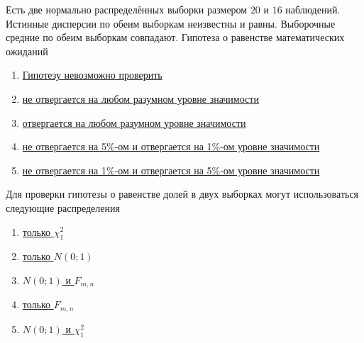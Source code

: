 \documentclass[t]{beamer}
\begin{document}
 \begin{frame} \label{7} 
\begin{block}{7} 

   Есть две нормально распределённых выборки размером $20$ и $16$ наблюдений. Истинные дисперсии по обеим выборкам неизвестны и равны. Выборочные средние по обеим выборкам совпадают. Гипотеза о равенстве математических ожиданий
  


 \end{block} 
\begin{enumerate} 
\item[] \hyperlink{7-No}{\beamergotobutton{} Гипотезу невозможно проверить}
\item[] \hyperlink{7-Yes}{\beamergotobutton{} не отвергается на любом разумном уровне значимости}
\item[] \hyperlink{7-No}{\beamergotobutton{} отвергается на любом разумном уровне значимости}
\item[] \hyperlink{7-No}{\beamergotobutton{} не отвергается на 5\%-ом и отвергается на 1\%-ом уровне значимости}
\item[] \hyperlink{7-No}{\beamergotobutton{} не отвергается на 1\%-ом и отвергается на 5\%-ом уровне значимости}
\end{enumerate} 
\end{frame} 


 \begin{frame} \label{8} 
\begin{block}{8} 

  Для проверки гипотезы о равенстве долей в двух выборках  могут использоваться следующие распределения
  


 \end{block} 
\begin{enumerate} 
\item[] \hyperlink{8-No}{\beamergotobutton{} только $\chi^2_1$}
\item[] \hyperlink{8-No}{\beamergotobutton{} только $N(0;1)$}
\item[] \hyperlink{8-No}{\beamergotobutton{} $N(0;1)$ и $F_{m,n}$}
\item[] \hyperlink{8-No}{\beamergotobutton{} только $F_{m,n}$}
\item[] \hyperlink{8-Yes}{\beamergotobutton{} $N(0;1)$ и $\chi^2_1$}
\end{enumerate} 
\end{frame} 
\end{document}
